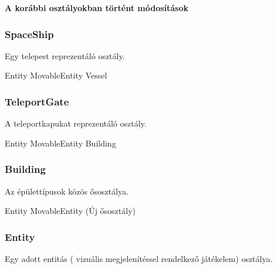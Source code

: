 \documentclass[../../projlab]{subfiles}
\begin{document}
\textbf{A korábbi osztályokban történt módosítások}

\subsubsection{SpaceShip}
\begin{class-template-responsibility}
    Egy telepest reprezentáló osztály.
\end{class-template-responsibility}
\begin{class-template-baseclass}
    Entity \baseclass MovableEntity \baseclass Vessel
\end{class-template-baseclass}
\begin{class-template-attribute}
\end{class-template-attribute}
\begin{class-template-method}
\end{class-template-method}


\subsubsection{TeleportGate}
\begin{class-template-responsibility}
    A teleportkapukat reprezentáló osztály.
\end{class-template-responsibility}
\begin{class-template-baseclass}
    Entity \baseclass MovableEntity \baseclass Building
\end{class-template-baseclass}
\begin{class-template-attribute}
\end{class-template-attribute}

\subsubsection{Building}
\begin{class-template-responsibility}
    Az épülettípusok közös ősosztálya.
\end{class-template-responsibility}
\begin{class-template-baseclass}
    Entity \baseclass MovableEntity  (Új ősosztály)
\end{class-template-baseclass}

\subsubsection{Entity}
\begin{class-template-responsibility}
    Egy adott entitás ( vizuális megjelenítéssel rendelkező játékelem) osztálya. 
\end{class-template-responsibility}
\begin{class-template-method}
\end{class-template-method}
\end{document}
